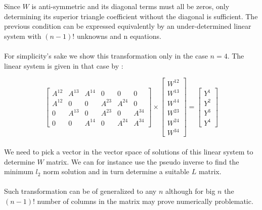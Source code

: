 \documentclass{article}
\begin{document}
\begin{appendices}
Since $W$ is anti-symmetric and its diagonal terms must all be zeros, only determining its superior triangle coefficient without the diagonal is sufficient. The previous condition can be expressed equivalently by an under-determined linear system with $(n-1)!$ unknowns and n equations. 

\paragraph{}
For simplicity's sake we show this transformation only in the case $n=4$. The linear system is given in that case by :

$$
\begin{bmatrix}
A^{12} & A^{13} & A^{14} & 0 & 0 & 0 \\
A^{12} & 0 & 0 & A^{23} & A^{24} & 0 \\
0 & A^{13} & 0 & A^{23} & 0 & A^{34} \\
0 & 0 & A^{14} & 0 & A^{24} & A^{34}
\end{bmatrix}
\times
\begin{bmatrix}
W^{12} \\
W^{13}\\
W^{14} \\
W^{23}\\
W^{24} \\
W^{34}
\end{bmatrix}
= 
\begin{bmatrix}
Y^1 \\
Y^2\\
Y^3 \\
Y^4
\end{bmatrix}
$$

\paragraph{}
We need to pick a vector in the vector space of solutions of this linear system to determine $W$ matrix. We can for instance use the pseudo inverse to find the minimum $l_2$ norm solution and in turn determine a suitable $L$ matrix. 

\paragraph{}
Such transformation can be of generalized to any $n$ although for big $n$ the $(n-1)!$ number of columns in the matrix may prove numerically problematic.

\end{appendices}


\printbibliography
\end{document}
